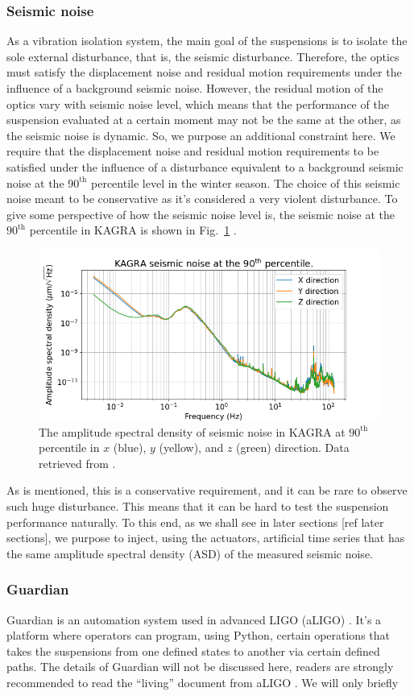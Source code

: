 \subsubsection{Seismic noise}
As a vibration isolation system, the main goal of the suspensions is to isolate the sole external disturbance, that is, the seismic disturbance.
Therefore, the optics must satisfy the displacement noise and residual motion requirements under the influence of a background seismic noise.
However, the residual motion of the optics vary with seismic noise level, which means that the performance of the suspension evaluated at a certain moment may not be the same at the other, as the seismic noise is dynamic.
So, we purpose an additional constraint here.
We require that the displacement noise and residual motion requirements to be satisfied under the influence of a disturbance equivalent to a background seismic noise at the $90^\mathrm{th}$ percentile level in the winter season.
The choice of this seismic noise meant to be conservative as it's considered a very violent disturbance.
To give some perspective of how the seismic noise level is, the seismic noise at the $90^\mathrm{th}$ percentile in KAGRA is shown in Fig.~\ref{fig:kagra_seismic_noise_90th_percentile} \cite{seismic_noise_kagra}.
\begin{figure}[!h]
	\centering
	\includegraphics[width=0.7\linewidth]{figures/kagra_seismic_noise_90th_percentile.png}
	\caption{The amplitude spectral density of seismic noise in KAGRA at $90^\mathrm{th}$ percentile in $x$ (blue), $y$ (yellow), and $z$ (green) direction. Data retrieved from \cite{seismic_noise_kagra}.}
	\label{fig:kagra_seismic_noise_90th_percentile}
\end{figure}
As is mentioned, this is a conservative requirement, and it can be rare to observe such huge disturbance.
This means that it can be hard to test the suspension performance naturally.
To this end, as we shall see in later sections [ref later sections], we purpose to inject, using the actuators, artificial time series that has the same amplitude spectral density (ASD) of the measured seismic noise.

\subsubsection{Guardian}
Guardian is an automation system used in advanced LIGO (aLIGO) \cite{advanced_ligo_guardian}.
It's a platform where operators can program, using Python, certain operations that takes the suspensions from one defined states to another via certain defined paths.
The details of Guardian will not be discussed here, readers are strongly recommended to read the ``living'' document from aLIGO \cite{advanced_ligo_guardian}.
We will only briefly 